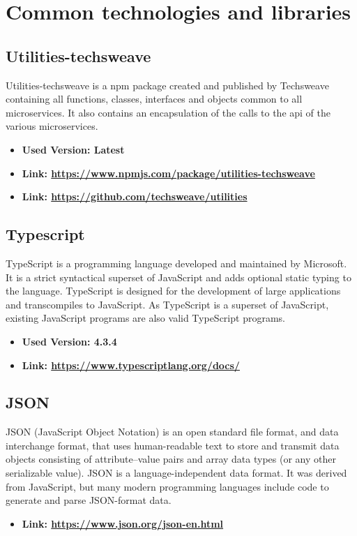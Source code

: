 \section{Common technologies and libraries}
\subsection{Utilities-techsweave}
Utilities-techsweave is a npm package created and published by Techsweave containing all functions, classes, interfaces and objects common to all microservices. It also contains an encapsulation of the calls to the api of the various microservices.
\begin{itemize}
  \item \textbf{Used Version: Latest}
  \item \textbf{Link: \url{https://www.npmjs.com/package/utilities-techsweave}}
  \item \textbf{Link: \url{https://github.com/techsweave/utilities}}
\end{itemize}
\subsection{Typescript}
TypeScript is a programming language developed and maintained by Microsoft. It is a strict syntactical
superset of JavaScript and adds optional static typing to the language. TypeScript is designed for the
development of large applications and transcompiles to JavaScript. As TypeScript is a superset of JavaScript,
existing JavaScript programs are also valid TypeScript programs.
\begin{itemize}
  \item \textbf{Used Version: 4.3.4}
  \item \textbf{Link: \url{https://www.typescriptlang.org/docs/}}
\end{itemize}
\subsection{JSON}
JSON (JavaScript Object Notation) is an open standard file format, and data interchange format, that
uses human-readable text to store and transmit data objects consisting of attribute–value pairs and
array data types (or any other serializable value).
JSON is a language-independent data format. It was derived from JavaScript,
but many modern programming languages include code to generate and parse JSON-format data.
\begin{itemize}
  \item \textbf{Link: \url{https://www.json.org/json-en.html}}
\end{itemize}
